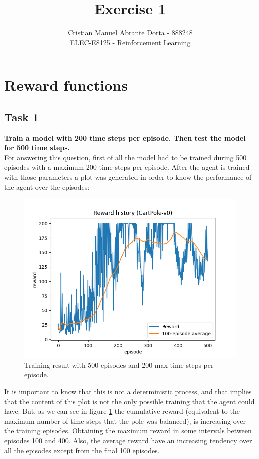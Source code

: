 \documentclass[12pt]{article}
\begin{document}
 
\title{Exercise 1}
\author{Cristian Manuel Abrante Dorta - 888248\\
ELEC-E8125 - Reinforcement Learning}

\maketitle
\section{Reward functions}
\label{sec:task-1}

\subsection{Task 1}
\label{sec:question-1.1}
\textbf {
    Train a model with 200 time steps per episode. Then test the model for 500 time steps.
}\\

For answering this question, first of all the model had to be trained during 500 episodes with a maximum 200 time steps per episode. After the agent is trained with those parameters a plot was generated in order to know the performance of the agent over the episodes:

\begin{figure}[ht]
    \centering
    \includegraphics[scale=0.5]{exercise-1/report/img/task-1-training-200.png}
    \caption{Training result with 500 episodes and 200 max time steps per episode.}
    \label{fig:training-200}
\end{figure}

It is important to know that this is not a deterministic process, and that implies that the content of this plot is not the only possible training that the agent could have. But, as we can see in figure \ref{fig:training-200} the cumulative reward (equivalent to the maximum number of time steps that the pole was balanced), is increasing over the training episodes. Obtaining the maximum reward in some intervals between episodes 100 and 400. Also, the average reward have an increasing tendency over all the episodes except from the final 100 episodes. \\
\end{document}
